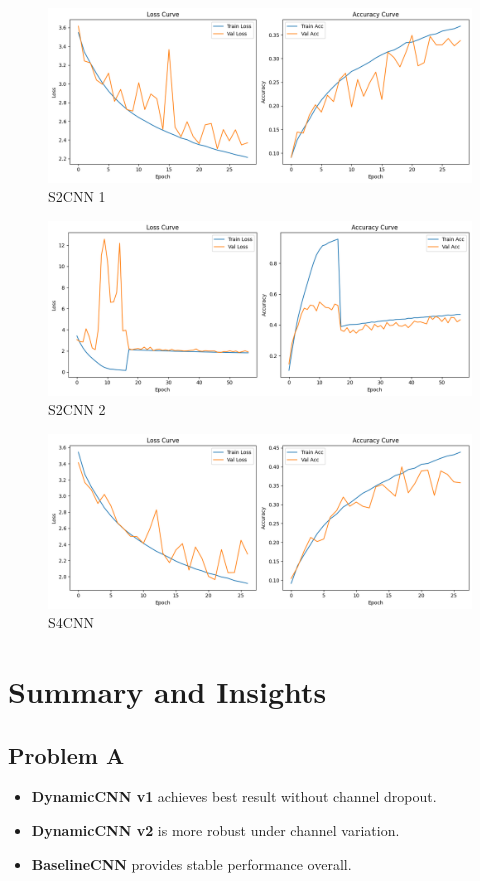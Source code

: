 \documentclass[12pt]{article}
\begin{document}
\begin{figure}[H]
\centering
\includegraphics[width=0.8\linewidth]{results/S2CNN_1.png}
\caption{S2CNN 1}
\end{figure}


\begin{figure}[H]
\centering
\includegraphics[width=0.8\linewidth]{results/S2CNN_2.png}
\caption{S2CNN 2}
\end{figure}


\begin{figure}[H]
\centering
\includegraphics[width=0.8\linewidth]{results/S4CNN.png}
\caption{S4CNN}
\end{figure}



\section*{Summary and Insights}

\subsection*{Problem A}
\begin{itemize}[noitemsep]
    \item \textbf{DynamicCNN v1} achieves best result without channel dropout.
    \item \textbf{DynamicCNN v2} is more robust under channel variation.
    \item \textbf{BaselineCNN} provides stable performance overall.
\end{itemize}
\end{document}
